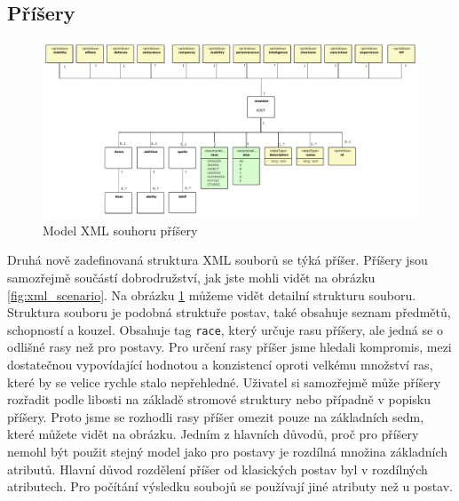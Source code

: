 \documentclass[thesis=B,czech]{resources/FITthesis}[2012/06/26]
\begin{document}
\subsection{Příšery}
\begin{figure}\centering
	\includegraphics[width=1\textwidth]{images/monsterXML}
	\caption[Model XML souhoru příšery]{Model XML souhoru příšery}\label{fig:xml_monster}
\end{figure}
Druhá nově zadefinovaná struktura XML souborů se týká příšer. Příšery jsou samozřejmě součástí dobrodružství, jak jste mohli vidět na obrázku \ref{fig:xml_scenario}. Na obrázku \ref{fig:xml_monster} můžeme vidět detailní strukturu souboru. Struktura souboru je podobná struktuře postav, také obsahuje seznam předmětů, schopností a kouzel. Obsahuje tag \texttt{race}, který určuje rasu příšery, ale jedná se o odlišné rasy než pro postavy. Pro určení rasy příšer jsme hledali kompromis, mezi dostatečnou vypovídající hodnotou a konzistencí oproti velkému množství ras, které by se velice rychle stalo nepřehledné. Uživatel si samozřejmě může příšery rozřadit podle libosti na základě stromové struktury nebo případně v popisku příšery. Proto jsme se rozhodli rasy příšer omezit pouze na základních sedm, které můžete vidět na obrázku. Jedním z hlavních důvodů, proč pro příšery nemohl být použit stejný model jako pro postavy je rozdílná množina základních atributů. Hlavní důvod rozdělení příšer od klasických postav byl v rozdílných atributech. Pro počítání výsledku soubojů se používají jiné atributy než u postav. 
\end{document}

